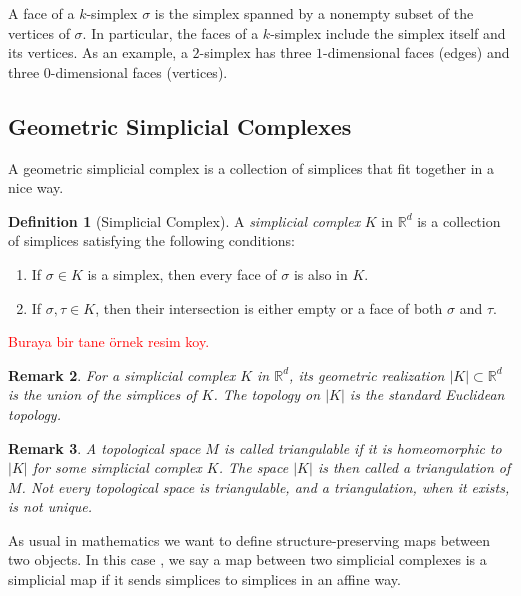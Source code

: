 \documentclass[11pt]{article}
\theoremstyle{definition}
\newtheorem{definition}{Definition}[section]
\theoremstyle{plain}
\newtheorem{remark}[definition]{Remark}
\begin{document}
A face of a $k$-simplex $\sigma$ is the simplex spanned by a nonempty subset of the vertices of $\sigma$. In particular, the faces of a $k$-simplex include the simplex itself and its vertices.
As an example, a $2$-simplex has three $1$-dimensional faces (edges) and three $0$-dimensional faces (vertices).
\subsection{Geometric Simplicial Complexes}

A geometric simplicial complex is a collection of simplices that fit together in a nice way.



\begin{definition}[Simplicial Complex]
    A \emph{simplicial complex} $K$ in $\mathbb{R}^d$ is a collection of simplices satisfying the following conditions:
    \begin{enumerate}[label=(\roman*)]
        \item If $\sigma \in K$ is a simplex, then every face of $\sigma$ is also in $K$.
        \item If $\sigma, \tau \in K$, then their intersection is either empty or a face of both $\sigma$ and $\tau$.
    \end{enumerate}
\end{definition}

\textcolor{red}{Buraya bir tane örnek resim  koy.}



\begin{remark}
    For a simplicial complex $K$ in $\mathbb{R}^d$, its \emph{geometric realization} $|K| \subset \mathbb{R}^d$ is the union of the simplices of $K$. The topology on $|K|$ is the standard Euclidean topology.
\end{remark}

\begin{remark}
    A topological space $M$ is called \emph{triangulable} if it is homeomorphic to $|K|$ for some simplicial complex $K$. The space $|K|$ is then called a \emph{triangulation} of $M$. Not every topological space is triangulable, and a triangulation, when it exists, is not unique.
\end{remark}

As usual in mathematics we want to define structure-preserving maps between two objects. In this case , we say a map between two simplicial complexes is a simplicial map if it sends simplices to simplices in an affine way.
\end{document}
